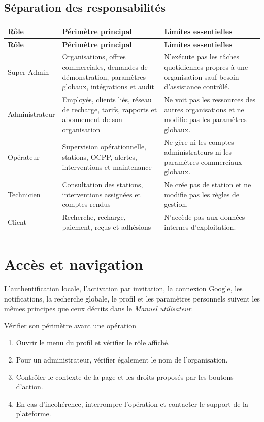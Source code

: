 \subsection{Séparation des responsabilités}

\begin{longtable}{|L{3.3cm}|L{5.4cm}|L{6.2cm}|}
  \hline
  \textbf{Rôle} & \textbf{Périmètre principal} & \textbf{Limites essentielles} \\ \hline
  \endfirsthead
  \hline
  \textbf{Rôle} & \textbf{Périmètre principal} & \textbf{Limites essentielles} \\ \hline
  \endhead
  Super Admin &
  Organisations, offres commerciales, demandes de démonstration, paramètres
  globaux, intégrations et audit &
  N'exécute pas les tâches quotidiennes propres à une organisation sauf besoin
  d'assistance contrôlé. \\ \hline
  Administrateur &
  Employés, clients liés, réseau de recharge, tarifs, rapports et abonnement de
  son organisation &
  Ne voit pas les ressources des autres organisations et ne modifie pas les
  paramètres globaux. \\ \hline
  Opérateur &
  Supervision opérationnelle, stations, OCPP, alertes, interventions et
  maintenance &
  Ne gère ni les comptes administrateurs ni les paramètres commerciaux
  globaux. \\ \hline
  Technicien &
  Consultation des stations, interventions assignées et comptes rendus &
  Ne crée pas de station et ne modifie pas les règles de gestion. \\ \hline
  Client &
  Recherche, recharge, paiement, reçus et adhésions &
  N'accède pas aux données internes d'exploitation. \\ \hline
\end{longtable}

\section{Accès et navigation}

L'authentification locale, l'activation par invitation, la connexion Google,
les notifications, la recherche globale, le profil et les paramètres
personnels suivent les mêmes principes que ceux décrits dans le
\emph{Manuel utilisateur}.

\begin{procedurebox}{Vérifier son périmètre avant une opération}
  \begin{enumerate}[leftmargin=*]
    \item Ouvrir le menu du profil et vérifier le rôle affiché.
    \item Pour un administrateur, vérifier également le nom de l'organisation.
    \item Contrôler le contexte de la page et les droits proposés par les
    boutons d'action.
    \item En cas d'incohérence, interrompre l'opération et contacter le support
    de la plateforme.
  \end{enumerate}
\end{procedurebox}


